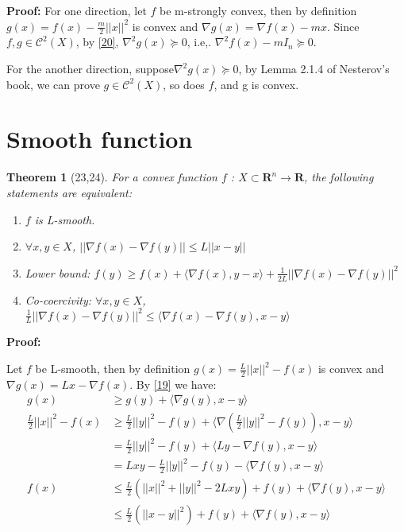 \documentclass[12pt]{article}
\theoremstyle{mystyle}
\newtheorem{theorem}{Theorem}
\begin{document}
\textbf{Proof: }For one direction, let $f$ be m-strongly convex, then by definition $g(x) =  f(x) - \frac{m}{2}||x||^2$ is convex and $\nabla g(x) = \nabla f(x) - mx$. 
Since $f,g \in \mathcal{C}^2(X)$, by \ref{20}, $\nabla^2 g(x) \succeq 0$, i.e,. $\nabla^2 f(x) - mI_n \succeq 0$.

For the another direction, suppose$\nabla^2 g(x) \succeq 0$, by Lemma 2.1.4 of Nesterov's book, we can prove $g \in \mathcal{C}^2(X)$, so does $f$, and g is convex.

\section{Smooth function}
\begin{theorem}[23,24]
    For a convex function $f$ : $X \subset \mathbf{R}^n \rightarrow \mathbf{R}$, the following statements are equivalent:
    \begin{enumerate}
        \item $f$ is L-smooth.
        \item $\forall x,y \in X$, $||\nabla f(x) -\nabla f(y) || \leq  L||x-y||$
        \item Lower bound: $f(y) \geq f(x) + \langle \nabla f(x), y - x \rangle + \frac{1}{2L}||\nabla f(x) - \nabla f(y)||^2$ 
        \item Co-coercivity: $\forall x,y \in X$, $\frac{1}{L}||\nabla f(x) -\nabla f(y) ||^2 \leq \langle \nabla f(x) - \nabla f(y), x - y\rangle$
    \end{enumerate}
\end{theorem}

\textbf{Proof:} 

Let $f$ be L-smooth, then by definition $g(x) = \frac{L}{2}||x||^2 - f(x)$ is convex and $\nabla g(x) = Lx - \nabla f(x)$. By \ref{19} we have:
\begin{equation}
\begin{split}
    g(x) &\geq g(y) + \langle \nabla g(y), x - y \rangle\\
    \frac{L}{2}||x||^2 - f(x) &\geq \frac{L}{2}||y||^2 - f(y) + \langle \nabla (\frac{L}{2}||y||^2 - f(y)), x - y \rangle \\
    &=\frac{L}{2}||y||^2 - f(y) + \langle Ly - \nabla f(y), x - y \rangle\\
    &= Lxy - \frac{L}{2}||y||^2 - f(y) - \langle \nabla f(y), x - y \rangle\\
    f(x) &\leq \frac{L}{2}(||x||^2+||y||^2 - 2Lxy) + f(y) + \langle \nabla f(y), x - y \rangle\\ 
    &\leq \frac{L}{2}(||x-y||^2) + f(y) + \langle \nabla f(y), x - y \rangle
\end{split}
\end{equation}
\end{document}
